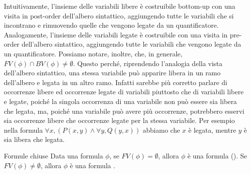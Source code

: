 Intuitivamente, l'insieme delle variabili libere è costruibile bottom-up con una visita in post-order dell'albero sintattico, aggiungendo tutte le variabili che si incontrano e rimuovendo quelle che vengono legate da un quantificatore.
Analogamente, l'insieme delle variabili legate è costruibile con una visita in pre-order dell'albero sintattico, aggiungendo tutte le variabili che vengono legate da un quantificatore.
Possiamo notare, inoltre, che, in generale, \(FV(\phi)\cap BV(\phi)\neq\emptyset\). Questo perché, riprendendo l'analogia della vista dell'albero sintattico, una stessa variabile può apparire libera in un ramo dell'albero e legata in un altro ramo. Infatti sarebbe più corretto parlare di occorrenze libere ed occorrenze legate di variabili piuttosto che di variabili libere e legate, poiché la singola occorrenza di una variabile non può essere sia libera che legata, ma, poiché una variabile può avere più occorrenze, potrebbero esservi sia occorrenze libere che occorrenze legate per la stessa variabile. Per esempio nella formula \(\forall x,(P(x,y)\land \forall y, Q(y,x))\) abbiamo che \(x\) è legata, mentre \(y\) è sia libera che legata.

\begin{definition}{Formule chiuse}
  Data una formula \(\phi\), se \(FV(\phi)=\emptyset\), allora \(\phi\) è una formula  ().
  Se \(FV(\phi)\neq\emptyset\), allora \(\phi\) è una formula .
\end{definition}

